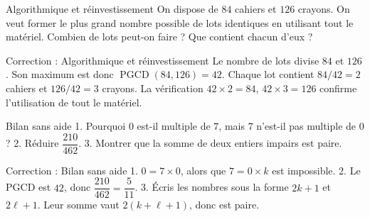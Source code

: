\documentclass[aspectratio=169,10pt]{beamer}
\begin{document}
\begin{frame}{Algorithmique et réinvestissement}
On dispose de \(84\) cahiers et \(126\) crayons. On veut former le plus grand nombre possible de lots identiques en utilisant tout le matériel. Combien de lots peut-on faire ? Que contient chacun d'eux ?
\end{frame}
\begin{frame}{Correction : Algorithmique et réinvestissement}
Le nombre de lots divise \(84\) et \(126\). Son maximum est donc \(\operatorname{PGCD}(84,126)=42\). Chaque lot contient \(84/42=2\) cahiers et \(126/42=3\) crayons. La vérification \(42\times2=84\), \(42\times3=126\) confirme l'utilisation de tout le matériel.
\end{frame}
\begin{frame}{Bilan sans aide}
1. Pourquoi \(0\) est-il multiple de \(7\), mais \(7\) n’est-il pas multiple de \(0\) ? 2. Réduire \(\dfrac{210}{462}\). 3. Montrer que la somme de deux entiers impairs est paire.
\end{frame}
\begin{frame}{Correction : Bilan sans aide}
1. \(0=7\times0\), alors que \(7=0\times k\) est impossible. 2. Le PGCD est \(42\), donc \(\dfrac{210}{462}=\dfrac5{11}\). 3. Écris les nombres sous la forme \(2k+1\) et \(2\ell+1\). Leur somme vaut \(2(k+\ell+1)\), donc est paire.
\end{frame}
\end{document}
